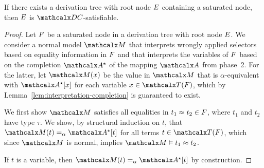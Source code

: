 \begin{theorem}%
\label{thm:ss}%
\afterDot
If there exists a derivation tree with root node $E$ containing a saturated node, then $E$ is $\thD$-satisfiable.
\end{theorem}
\begin{proof}
Let $F$ be a saturated node in a derivation tree with root node $E$.
We consider a normal model $\M$
that interprets wrongly applied selectors based on equality information in $F$
and that interprets the variables of $F$ based on the completion $\ValC$ of the mapping $\Val$ from phase~2.
For the latter, let $\M( x )$ be the value in $\M$ that is $\alpha$-equivalent with $\ValC \ec{x}$ for each variable $x \in \Terms(\Fc)$,
which by Lemma~\ref{lem:interpretation-completion} is guaranteed to exist.

We first show $\M$ satisfies all equalities in $t_1 \approx t_2 \in F$, where $t_1$ and $t_2$ have type $\tau$.
We show,
by structural induction on $t$,
that $\M( t ) \aequiv \ValC \ec{t}$ for all terms $t \in \Terms( \Fc )$,
which since $\M$ is normal, implies $\M \models t_1 \teq t_2$.

If $t$ is a variable, then $\M( t ) \vsim \ValC \ec{ t }$ by construction.


\end{proof}
